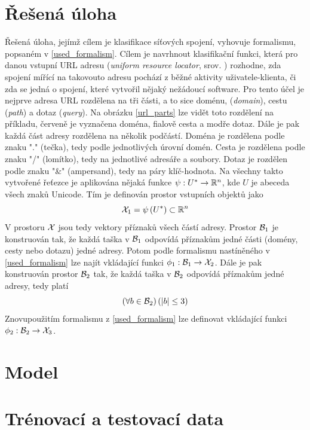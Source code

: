 \section{Řešená úloha}
Řešená úloha, jejímž cílem je klasifikace síťových spojení, vyhovuje formalismu, popsaném v \ref{used_formalism}. Cílem je navrhnout klasifikační funkci, která pro danou vstupní URL adresu (\textit{\textenglish{uniform resource locator}}, srov. \cite{berners-lee_uniform_1994}) rozhodne, zda spojení mířící na takovouto adresu pochází z běžné aktivity uživatele-klienta, či zda se jedná o spojení, které vytvořil nějaký nežádoucí software. Pro tento účel je nejprve adresa URL rozdělena na tři části, a to sice doménu, (\textit{\textenglish{domain}}), cestu (\textit{\textenglish{path}}) a dotaz (\textit{\textenglish{query}}). Na obrázku \ref{url_parts} lze vidět toto rozdělení na příkladu, červeně je vyznačena doména, fialově cesta a modře dotaz. Dále je pak každá část adresy rozdělena na několik podčástí. Doména je rozdělena podle znaku "." (tečka), tedy podle jednotlivých úrovní domén. Cesta je rozdělena podle znaku "/" (lomítko), tedy na jednotlivé adresáře a soubory. Dotaz je rozdělen podle znaku "\&" (ampersand), tedy na páry klíč-hodnota. Na všechny takto vytvořené řeťezce je aplikována nějaká funkce \( \psi : U^* \to \mathbb R^n \), kde \( U \) je abeceda všech znaků Unicode. Tím je definován prostor vstupních objektů jako
\begin{equation}
	\mathcal X_1 = \psi \left( U^* \right) \subset \mathbb R^n
\end{equation}
V prostoru \( \mathcal X \) jsou tedy vektory příznaků všech částí adresy. Prostor \( \mathcal B_1 \) je konstruován tak, že každá taška v \( \mathcal B_1 \) odpovídá příznakům jedné části (domény, cesty nebo dotazu) jedné adresy. Potom podle formalismu nastíněného v \ref{used_formalism} lze najít vkládající funkci \( \phi_1 : \mathcal B_1 \to \mathcal X_2 \). Dále je pak konstruován prostor \( \mathcal B_2 \) tak, že každá taška v \( \mathcal B_2 \) odpovídá příznakům jedné adresy, tedy platí
\begin{equation}
	\left( \forall b \in \mathcal B_2 \right) \left( \left| b \right| \leq 3 \right)
\end{equation}
Znovupoužitím formalismu z \ref{used_formalism} lze definovat vkládající funkci \( \phi_2 : \mathcal B_2 \to \mathcal X_3 \).


\section{Model}

\section{Trénovací a testovací data}

